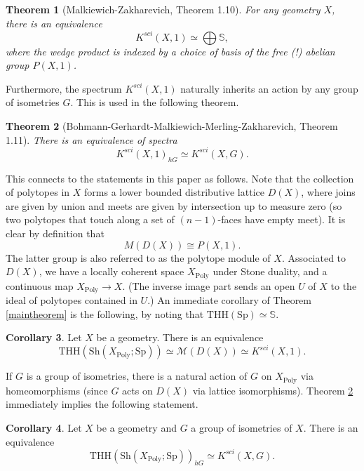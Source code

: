 \documentclass[10pt]{amsart}
\newtheorem{theorem}{Theorem}[section]
\theoremstyle{definition}
\newtheorem{corollary}[theorem]{Corollary}
\begin{document}
\begin{theorem}[Malkiewich-Zakharevich, \cite{malkiewich2024higherscissorscongruence} Theorem 1.10]
For any geometry $X$, there is an equivalence
$$K^{sci}(X,1) \simeq \bigoplus \mathbb{S},$$
where the wedge product is indexed by a choice of basis of the free (!) abelian group $P(X,1)$.
\end{theorem}

Furthermore, the spectrum $K^{sci}(X,1)$ naturally inherits an action by any group of isometries $G$. This is used in the following theorem.

\begin{theorem}[Bohmann-Gerhardt-Malkiewich-Merling-Zakharevich, \cite{malkiewich2024higherscissorscongruence} Theorem 1.11] \label{scissorsequivariant}
There is an equivalence of spectra
$$K^{sci}(X,1)_{hG} \simeq K^{sci}(X,G).$$
\end{theorem}

This connects to the statements in this paper as follows. Note that the collection of polytopes in $X$ forms a lower bounded distributive lattice $D(X)$, where joins are given by union and meets are given by intersection up to measure zero (so two polytopes that touch along a set of $(n-1)$-faces have empty meet). It is clear by definition that
$$M(D(X)) \cong P(X,1).$$
The latter group is also referred to as the polytope module of $X$. Associated to $D(X)$, we have a locally coherent space $X_{\mathrm{Poly}}$ under Stone duality, and a continuous map $X_{\mathrm{Poly}} \rightarrow X$. (The inverse image part sends an open $U$ of $X$ to the ideal of polytopes contained in $U$.) An immediate corollary of Theorem \ref{maintheorem} is the following, by noting that $\mathrm{THH}(\mathrm{Sp}) \simeq \mathbb{S}$.

\begin{corollary}
Let $X$ be a geometry. There is an equivalence
$$\mathrm{THH}( \mathrm{Sh}( X_{\mathrm{Poly}}; \mathrm{Sp} ) ) \simeq \mathcal{M}(D(X)) \simeq K^{sci}(X,1).$$
\end{corollary}

If $G$ is a group of isometries, there is a natural action of $G$ on $X_{\mathrm{Poly}}$ via homeomorphisms (since $G$ acts on $D(X)$ via lattice isomorphisms). Theorem \ref{scissorsequivariant} immediately implies  the following statement.

\begin{corollary}
Let $X$ be a geometry and $G$ a group of isometries of $X$. There is an equivalence
$$\mathrm{THH}( \mathrm{Sh}( X_{\mathrm{Poly}}; \mathrm{Sp} ))_{hG}  \simeq K^{sci}(X,G).$$
\end{corollary}
\end{document}
